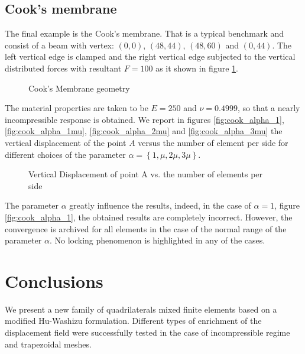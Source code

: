 \documentclass[preprint,12pt,authoryear]{elsarticle}
\begin{document}
\subsection{Cook's membrane}
The final example is the Cook's membrane. That is a typical benchmark and consist of a beam with vertex: $(0,0)$, $(48,44)$, $(48,60)$ and $(0,44)$.
The left vertical edge is clamped and the right vertical edge subjected to the vertical distributed forces with resultant $F=100$ as it shown in figure \ref{fig:cook}.
%
\begin{figure}[h!]
\begin{center}

\caption{Cook's Membrane geometry \label{fig:cook}}
\end{center}
\end{figure}
The material properties are taken to be $E = 250$ and $\nu = 0.4999$, so that a nearly incompressible response is obtained.
We report in figures \ref{fig:cook_alpha_1}, \ref{fig:cook_alpha_1mu}, \ref{fig:cook_alpha_2mu} and \ref{fig:cook_alpha_3mu} the vertical displacement of the point $A$ versus the number of element per side for different choices of the parameter $\alpha=\left\lbrace 1, \mu, 2\mu, 3\mu \right\rbrace$.
\begin{figure}[h!]
\begin{center}
\subfigure[$\alpha=1$ \label{fig:cook_alpha_1}]
{}
\subfigure[$\alpha/ \mu=1$ \label{fig:cook_alpha_1mu}]
{}
\subfigure[$\alpha/ \mu=2$ \label{fig:cook_alpha_2mu}]
{}
\subfigure[$\alpha/ \mu=3$ \label{fig:cook_alpha_3mu}]
{}
\caption{Vertical Displacement of point A vs. 
the number of elements per side}
\end{center}
\end{figure}
The parameter $\alpha$ greatly influence the results, indeed, in the case of $\alpha=1$, figure \ref{fig:cook_alpha_1}, the obtained results are completely incorrect.
However, the convergence is archived for all elements in the case of the normal range of the parameter $\alpha$.
No locking phenomenon is highlighted in any of the cases. 

\section{Conclusions}\label{sec:six}
We present a new family of quadrilaterals mixed finite elements based on a modified Hu-Washizu formulation.
Different types of enrichment of the displacement field were successfully tested in the case of incompressible regime and trapezoidal meshes.
\end{document}
